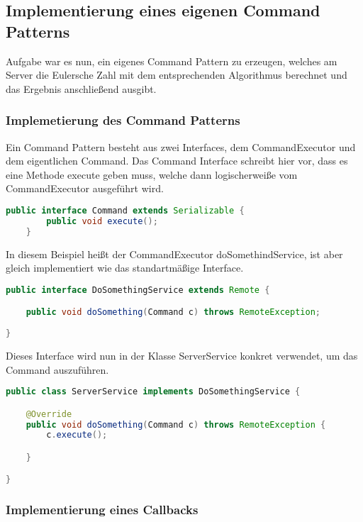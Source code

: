 \subsection{Implementierung eines eigenen Command Patterns}

Aufgabe war es nun, ein eigenes Command Pattern zu erzeugen, welches am Server die Eulersche Zahl mit dem entsprechenden Algorithmus berechnet und das Ergebnis anschlie{\ss}end ausgibt.

\subsubsection{Implemetierung des Command Patterns}

Ein Command Pattern besteht aus zwei Interfaces, dem CommandExecutor und dem eigentlichen Command. Das Command Interface schreibt hier vor, 
dass es eine Methode execute geben muss, welche dann logischerwei{\ss}e vom CommandExecutor ausgeführt wird.
\begin{lstlisting}[caption=Command Interface, language=Java]
	public interface Command extends Serializable {
		public void execute();
	}
\end{lstlisting}

In diesem Beispiel heißt der CommandExecutor doSomethindService, ist aber gleich implementiert wie das standartmä{\ss}ige Interface.

\begin{lstlisting}[caption=Command Executor, language=Java]
	public interface DoSomethingService extends Remote {

	public void doSomething(Command c) throws RemoteException;
	
}
\end{lstlisting}

Dieses Interface wird nun in der Klasse ServerService konkret verwendet, um das Command auszuführen.

\begin{lstlisting}[caption=ServerService Klasse, language=Java]
	public class ServerService implements DoSomethingService {

	@Override
	public void doSomething(Command c) throws RemoteException {
		c.execute();

	}

}
\end{lstlisting}
\clearpage

\subsubsection{Implementierung eines Callbacks}

